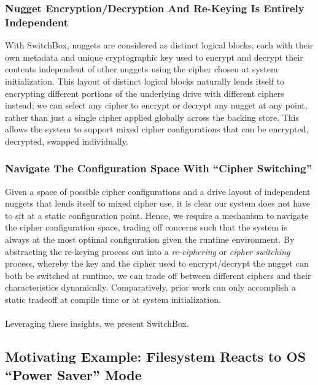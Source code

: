 \subsubsection{Nugget Encryption/Decryption And Re-Keying Is Entirely Independent}

With SwitchBox, nuggets are considered as distinct logical blocks, each with
their own metadata and unique cryptographic key used to encrypt and decrypt
their contents independent of other nuggets using the cipher chosen at system
initialization. This layout of distinct logical blocks naturally lends itself to
encrypting different portions of the underlying drive with different ciphers
instead; we can select any cipher to encrypt or decrypt any nugget at any point,
rather than just a single cipher applied globally across the backing store. This
allows the system to support mixed cipher configurations that can be encrypted,
decrypted, swapped individually.

\subsubsection{Navigate The Configuration Space With ``Cipher Switching''}

Given a space of possible cipher configurations and a drive layout of
independent nuggets that lends itself to mixed cipher use, it is clear our
system does not have to sit at a static configuration point. Hence, we require a
mechanism to navigate the cipher configuration space, trading off concerns such
that the system is always at the most optimal configuration given the runtime
environment. By abstracting the re-keying process out into a \emph{re-ciphering}
or \emph{cipher switching} process, whereby the key and the cipher used to
encrypt/decrypt the nugget can both be switched at runtime, we can trade off
between different ciphers and their characteristics dynamically. Comparatively,
prior work can only accomplish a static tradeoff at compile time or at
system initialization. \\
\\
Leveraging these insights, we present SwitchBox. 

\subsection{Motivating Example: Filesystem Reacts to OS ``Power Saver'' Mode}

